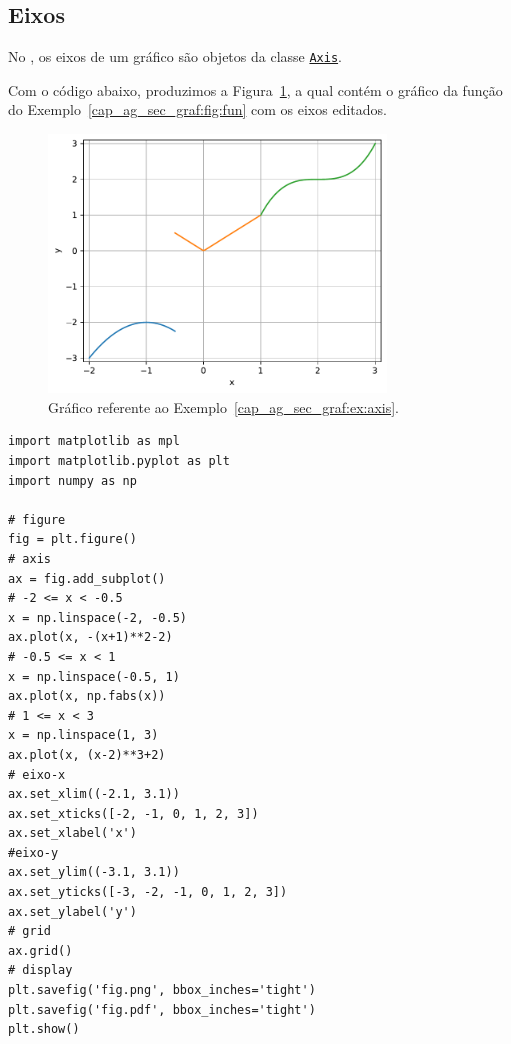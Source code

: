 \subsection{Eixos}

No {\matplotlib}, os eixos de um gráfico são objetos da classe \href{https://matplotlib.org/stable/api/axis_api.html#matplotlib.axis.Axis}{\lstinline+Axis+}.

\begin{ex}\label{cap_ag_sec_graf:ex:axis}
  Com o código abaixo, produzimos a Figura~\ref{cap_ag_sec_graf:fig:eixos}, a qual contém o gráfico da função do Exemplo~\ref{cap_ag_sec_graf:fig:fun} com os eixos editados.

  \begin{figure}[H]
    \centering
    \includegraphics[width=0.8\textwidth]{./cap_ag/dados/fig_eixos/fig}
    \caption{Gráfico referente ao Exemplo~\ref{cap_ag_sec_graf:ex:axis}.}
    \label{cap_ag_sec_graf:fig:eixos}
  \end{figure}  

\begin{lstlisting}
import matplotlib as mpl
import matplotlib.pyplot as plt
import numpy as np

# figure
fig = plt.figure()
# axis
ax = fig.add_subplot()
# -2 <= x < -0.5
x = np.linspace(-2, -0.5)
ax.plot(x, -(x+1)**2-2)
# -0.5 <= x < 1
x = np.linspace(-0.5, 1)
ax.plot(x, np.fabs(x))
# 1 <= x < 3
x = np.linspace(1, 3)
ax.plot(x, (x-2)**3+2)
# eixo-x
ax.set_xlim((-2.1, 3.1))
ax.set_xticks([-2, -1, 0, 1, 2, 3])
ax.set_xlabel('x')
#eixo-y
ax.set_ylim((-3.1, 3.1))
ax.set_yticks([-3, -2, -1, 0, 1, 2, 3])
ax.set_ylabel('y')
# grid
ax.grid()
# display
plt.savefig('fig.png', bbox_inches='tight')
plt.savefig('fig.pdf', bbox_inches='tight')
plt.show()
\end{lstlisting}

\end{ex}

